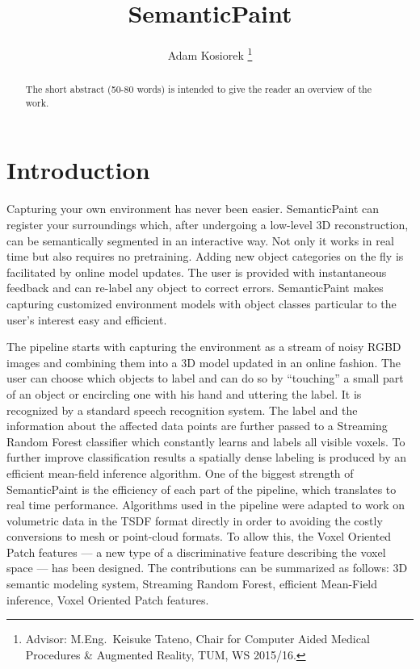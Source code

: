 \documentclass{llncs}
\begin{document}
	\title{SemanticPaint}
	\author{Adam Kosiorek
	\thanks{Advisor: M.Eng.~Keisuke Tateno, Chair for Computer Aided Medical Procedures \& Augmented Reality, TUM, WS 2015/16.}}
	\institute{}
	\maketitle

\begin{abstract}
	The short abstract (50-80 words) is intended to give the reader an overview of the work.
\end{abstract}

\section{Introduction}
  
  
  Capturing your own environment has never been easier. SemanticPaint can register your surroundings which, after undergoing a low-level 3D reconstruction, can be semantically segmented in an interactive way. Not only it works in real time but also requires no pretraining. Adding new object categories on the fly is facilitated by online model updates. The user is provided with instantaneous feedback and can re-label any object to correct errors. SemanticPaint makes capturing customized environment models with object classes particular to the user's interest easy and efficient.  
  
  The pipeline starts with capturing the environment as a stream of noisy RGBD images and combining them into a  3D model updated in an online fashion. The user can choose which objects to label and can do so by ``touching'' a small part of an object or encircling one with his hand and uttering the label. It is recognized by a standard speech recognition system. The label and the information about the affected data points are further passed to a Streaming Random Forest classifier which constantly learns and labels all visible voxels. To further improve classification results a spatially dense labeling is produced by an efficient mean-field inference algorithm. One of the biggest strength of SemanticPaint is the efficiency of each part of the pipeline, which translates to real time performance. Algorithms used in the pipeline were adapted to work on volumetric data in the TSDF format directly in order to avoiding the costly conversions to mesh or point-cloud formats. To allow this, the Voxel Oriented Patch features --- a new type of a discriminative feature describing the voxel space --- has been designed. 
  The contributions can be summarized as follows: 3D semantic modeling system, Streaming Random Forest, efficient Mean-Field inference, Voxel Oriented Patch features.
  
\end{document}
